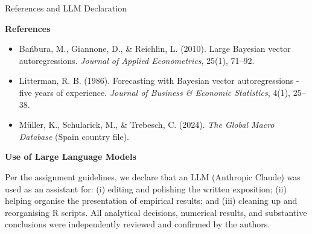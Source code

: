 \documentclass[9pt]{beamer}
\begin{document}
\begin{frame}{References and LLM Declaration}
\label{slide:refs}
\scriptsize

\textbf{References}

\begin{itemize}
    \item Bańbura, M., Giannone, D., \& Reichlin, L. (2010). Large Bayesian vector autoregressions. \textit{Journal of Applied Econometrics}, 25(1), 71--92.
    \item Litterman, R. B. (1986). Forecasting with Bayesian vector autoregressions - five years of experience. \textit{Journal of Business \& Economic Statistics}, 4(1), 25--38.
    \item Müller, K., Schularick, M., \& Trebesch, C. (2024). \textit{The Global Macro Database} (Spain country file).
\end{itemize}

\vspace{0.25cm}

\textbf{Use of Large Language Models}

Per the assignment guidelines, we declare that an LLM (Anthropic Claude) was used as an assistant for:
(i) editing and polishing the written exposition;
(ii) helping organise the presentation of empirical results; and
(iii) cleaning up and reorganising R scripts. All analytical decisions, numerical results, and substantive conclusions were independently reviewed and confirmed by the authors.

\end{frame}
\end{document}
